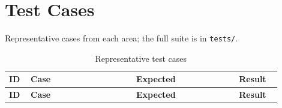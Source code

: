 \documentclass[12pt,a4paper]{report}
\begin{document}
\section{Test Cases}

Representative cases from each area; the full suite is in \texttt{tests/}.

\begin{longtable}{@{}p{0.07\linewidth}p{0.35\linewidth}p{0.34\linewidth}p{0.14\linewidth}@{}}
\caption{Representative test cases}\label{tab:cases}\\
\toprule
\textbf{ID} & \textbf{Case} & \textbf{Expected} & \textbf{Result} \\
\midrule
\endfirsthead
\toprule
\textbf{ID} & \textbf{Case} & \textbf{Expected} & \textbf{Result} \\
\midrule
\endhead


\end{longtable}
\end{document}
